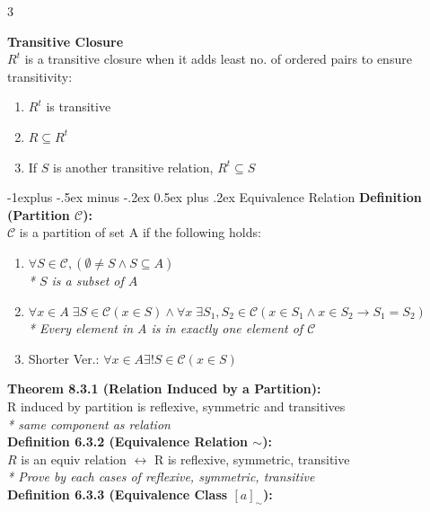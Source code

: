 \documentclass[10pt,landscape]{article}
\makeatletter
\renewcommand{\subsection}{\@startsection{subsection}{2}{0mm}%
    {-1explus -.5ex minus -.2ex}%
    {0.5ex plus .2ex}%
    {\normalfont\normalsize\bfseries}}
\makeatother
\begin{document}
\begin{multicols}{3}
\begin{enumerate}
    \end{enumerate}
    \textbf{Transitive Closure} \\
    $R^t$ is a transitive closure when it adds least no. of ordered pairs to ensure transitivity: \\
    \begin{enumerate}
        \item $R^t$ is transitive
        \item $R \subseteq R^t$
        \item If $S$ is another transitive relation, $R^t \subseteq S$
    \end{enumerate}

    \subsection{Equivalence Relation}
    \textbf{Definition (Partition $\mathscr{C}$):} \\
    $\mathscr{C}$ is a partition of set A if the following holds:
    \begin{enumerate}
        \item $\forall S \in \mathscr{C}, (\emptyset \neq S \land S \subseteq A)$ \\
              \textit{* $S$ is a subset of $A$}
        \item $\forall x \in A \; \exists S \in \mathscr{C} (x \in S) \land
                  \forall x \; \exists S_1, S_2 \in \mathscr{C} (x \in S_1 \land x \in S_2 \rightarrow S_1 = S_2)$ \\
              \textit{* Every element in A is in exactly one element of $\mathscr{C}$}
        \item Shorter Ver.: $\forall x \in A \exists! S \in \mathscr{C} (x \in S)$
    \end{enumerate}
    \textbf{Theorem 8.3.1 (Relation Induced by a Partition):} \\
    R induced by partition is reflexive, symmetric and transitives \\
    \textit{* same component as relation} \\
    \textbf{Definition 6.3.2 (Equivalence Relation $\sim$):} \\
    $R$ is an equiv relation $\leftrightarrow$ R is reflexive, symmetric, transitive \\
    \textit{* Prove by each cases of reflexive, symmetric, transitive} \\
    \textbf{Definition 6.3.3 (Equivalence Class $[a]_\sim$):} \\

\end{multicols}
\end{document}
